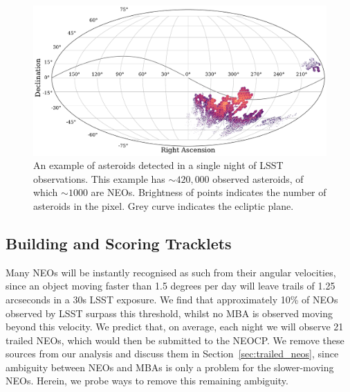 \documentclass[twocolumn]{aastex631}
\begin{document}
\begin{figure}[htb]
    \centering
    \includegraphics[width=\columnwidth]{observations_example.pdf}
    \caption{An example of asteroids detected in a single night of LSST observations. This example has ${\sim}420,000$ observed asteroids, of which ${\sim}1000$ are NEOs. Brightness of points indicates the number of asteroids in the pixel. Grey curve indicates the ecliptic plane.}
    \label{fig:observations_per_night}
\end{figure}

\subsection{Building and Scoring Tracklets}\label{sec:digest2_score}
Many NEOs will be instantly recognised as such from their angular velocities, since an object moving faster than 1.5 degrees per day will leave trails of 1.25 arcseconds in a 30s LSST exposure. We find that approximately 10\% of NEOs observed by LSST surpass this threshold, whilst no MBA is observed moving beyond this velocity. We predict that, on average, each night we will observe 21 trailed NEOs, which would then be submitted to the NEOCP. We remove these sources from our analysis and discuss them in Section~\ref{sec:trailed_neos}, since ambiguity between NEOs and MBAs is only a problem for the slower-moving NEOs. Herein, we probe ways to remove this remaining ambiguity.
\end{document}
